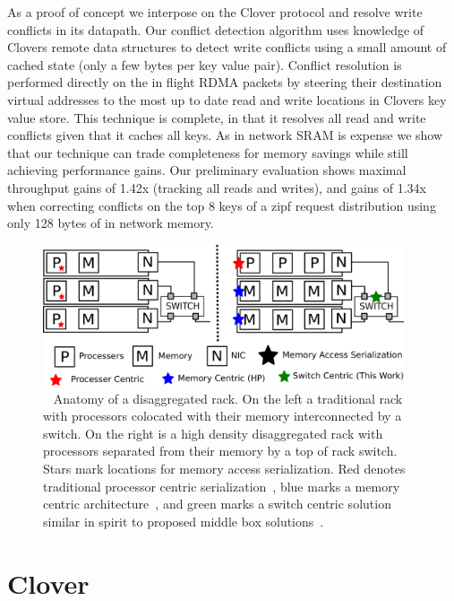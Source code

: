 As a proof of concept we interpose on the Clover protocol and resolve
write conflicts in its datapath. Our conflict detection algorithm uses
knowledge of Clovers remote data structures to detect write conflicts
using a small amount of cached state (only a few bytes per key value
pair). Conflict resolution is performed directly on the in flight RDMA
packets by steering their destination virtual addresses to the most up
to date read and write locations in Clovers key value store. This
technique is complete, in that it resolves all read and write
conflicts given that it caches all keys. As in network SRAM is expense
we show that our technique can trade completeness for memory savings
while still achieving performance gains. Our preliminary evaluation
shows maximal throughput gains of 1.42x (tracking all reads and
writes), and gains of 1.34x when correcting conflicts on the top 8
keys of a zipf request distribution using only 128 bytes of in network
memory.

\begin{figure}
      \centering
      \includegraphics[width=0.95\textwidth]{fig/overview.png}
      \caption{~
      Anatomy of a disaggregated rack. On the left a
      traditional rack with processors colocated with their memory
      interconnected by a switch. On the right is a high density
      disaggregated rack with processors separated from their memory
      by a top of rack switch. Stars mark locations for memory access
      serialization. Red denotes traditional processor centric
      serialization~\cite{memc3, cell, sonuma, storm, clover}, blue marks a
      memory centric architecture~\cite{aguilera2019designing}, and
      green marks a switch centric solution similar in spirit to
      proposed middle box solutions~\cite{254120}.
      \label{fig:overview}
      }
\end{figure}



\section{Clover}

